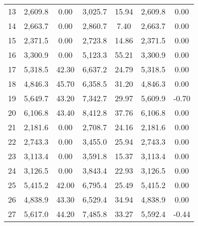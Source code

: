 \documentclass[11pt]{article}
\begin{document}
\begin{table}[H]
\begin{tabular}{@{}ccccccc@{}}
\multicolumn{1}{c|}{13}       & 2,609.8       & 0.00      & 3,025.7                   & 15.94          & 2,609.8     & 0.00        \\
\multicolumn{1}{c|}{14}       & 2,663.7       & 0.00      & 2,860.7                   & 7.40          & 2,663.7     & 0.00        \\
\multicolumn{1}{c|}{15}       & 2,371.5       & 0.00      & 2,723.8                   & 14.86          & 2,371.5     & 0.00        \\
\multicolumn{1}{c|}{16}       & 3,300.9       & 0.00      & 5,123.3                   & 55.21          & 3,300.9     & 0.00      \\
\multicolumn{1}{c|}{17}       & 5,318.5       & 42.30      & 6,637.2                   & 24.79          & 5,318.5     & 0.00    \\
\multicolumn{1}{c|}{18}       & 4,846.3       & 45.70      & 6,358.5                   & 31.20          & 4,846.3     & 0.00    \\
\multicolumn{1}{c|}{19}       & 5,649.7       & 43.20      & 7,342.7                   & 29.97          & 5,609.9     & -0.70    \\
\multicolumn{1}{c|}{20}       & 6,106.8       & 43.40      & 8,412.8                   & 37.76          & 6,106.8     & 0.00        \\
\multicolumn{1}{c|}{21}       & 2,181.6       & 0.00      & 2,708.7                   & 24.16          & 2,181.6     & 0.00        \\
\multicolumn{1}{c|}{22}       & 2,743.3       & 0.00      & 3,455.0                   & 25.94          & 2,743.3     & 0.00        \\
\multicolumn{1}{c|}{23}       & 3,113.4       & 0.00      & 3,591.8                   & 15.37          & 3,113.4     & 0.00        \\
\multicolumn{1}{c|}{24}       & 3,126.5       & 0.00      & 3,843.4                   & 22.93          & 3,126.5     & 0.00        \\
\multicolumn{1}{c|}{25}       & 5,415.2       & 42.00      & 6,795.4                   & 25.49          & 5,415.2     & 0.00        \\
\multicolumn{1}{c|}{26}       & 4,838.9       & 43.30      & 6,529.4                   & 34.94          & 4,838.9     & 0.00        \\
\multicolumn{1}{c|}{27}       & 5,617.0       & 44.20      & 7,485.8                   & 33.27          & 5,592.4     & -0.44    \\

\end{tabular}
\end{table}
\end{document}
